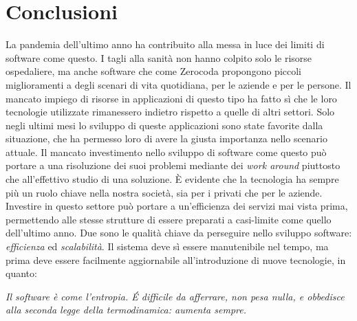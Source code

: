 \chapter{Conclusioni}
\label{chap:conclusion}
La pandemia dell'ultimo anno ha contribuito alla messa in luce dei limiti di software come questo. I tagli alla sanità non hanno colpito solo le risorse ospedaliere, ma anche software che come Zerocoda propongono piccoli miglioramenti a degli scenari di vita quotidiana, per le aziende e per le persone. Il mancato impiego di risorse in applicazioni di questo tipo ha fatto sì che le loro tecnologie utilizzate rimanessero indietro rispetto a quelle di altri settori. Solo negli ultimi mesi lo sviluppo di queste applicazioni sono state favorite dalla situazione, che ha permesso loro di avere la giusta importanza nello scenario attuale. Il mancato investimento nello sviluppo di software come questo può portare a una risoluzione dei suoi problemi mediante dei \emph{work around} piuttosto che all'effettivo studio di una soluzione. È evidente che la tecnologia ha sempre più un ruolo chiave nella nostra società, sia per i privati che per le aziende. Investire in questo settore può portare a un'efficienza dei servizi mai vista prima, permettendo alle stesse strutture di essere preparati a casi-limite come quello dell'ultimo anno. Due sono le qualità chiave da perseguire nello sviluppo software: \emph{efficienza} ed \emph{scalabilità}. Il sistema deve sì essere manutenibile nel tempo, ma prima deve essere facilmente aggiornabile all'introduzione di nuove tecnologie, in quanto:
\begin{center}
    \textit{Il software è come l'entropia. É difficile da afferrare, non pesa nulla, e obbedisce alla seconda legge della termodinamica: aumenta sempre.}
\end{center}
